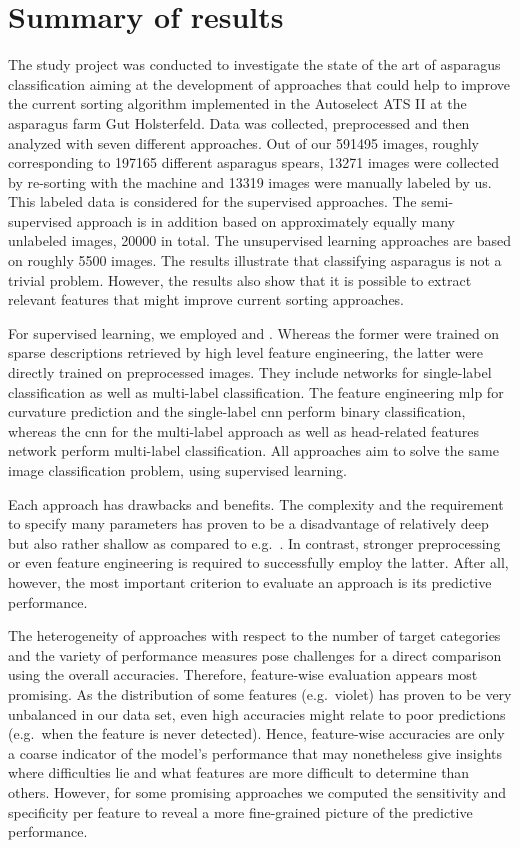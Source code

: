 \section{Summary of results}
\label{ch:Summary}

The study project was conducted to investigate the state of the art of asparagus classification aiming at the development of approaches that could help to improve the current sorting algorithm implemented in the Autoselect ATS II at the asparagus farm Gut Holsterfeld. Data was collected, preprocessed and then analyzed with seven different approaches. Out of our 591495 images, roughly corresponding to 197165 different asparagus spears, 13271 images were collected by re-sorting with the machine and 13319 images were manually labeled by us. This labeled data is considered for the supervised approaches. The semi-supervised approach is in addition based on approximately equally many unlabeled images, 20000 in total. The unsupervised learning approaches are based on roughly 5500 images. The results illustrate that classifying asparagus is not a trivial problem. However, the results also show that it is possible to extract relevant features that might improve current sorting approaches.

\bigskip
For supervised learning, we employed  and  . Whereas the former were trained on sparse descriptions retrieved by high level feature engineering, the latter were directly trained on preprocessed images. They include networks for single-label classification as well as multi-label classification. 
The feature engineering \acrshort{mlp} for curvature prediction and the single-label  \acrshort{cnn} perform binary classification, whereas the  \acrshort{cnn} for the multi-label approach as well as head-related features network perform multi-label classification. All approaches aim to solve the same image classification problem, using supervised learning.

Each approach has drawbacks and benefits. The complexity and the requirement to specify many parameters has proven to be a disadvantage of relatively deep but also rather shallow  as compared to e.g.\ . In contrast, stronger preprocessing or even feature engineering is required to successfully employ the latter. After all, however, the most important criterion to evaluate an approach is its predictive performance.

The heterogeneity of approaches with respect to the number of target categories and the variety of performance measures pose challenges for a direct comparison using the overall accuracies. Therefore, feature-wise evaluation appears most promising. As the distribution of some features (e.g.\ violet) has proven to be very unbalanced in our data set, even high accuracies might relate to poor predictions (e.g.\ when the feature is never detected). Hence, feature-wise accuracies are only a coarse indicator of the model’s performance that may nonetheless give insights where difficulties lie and what features are more difficult to determine than others. However, for some promising approaches we computed the sensitivity and specificity per feature to reveal a more fine-grained picture of the predictive performance.

